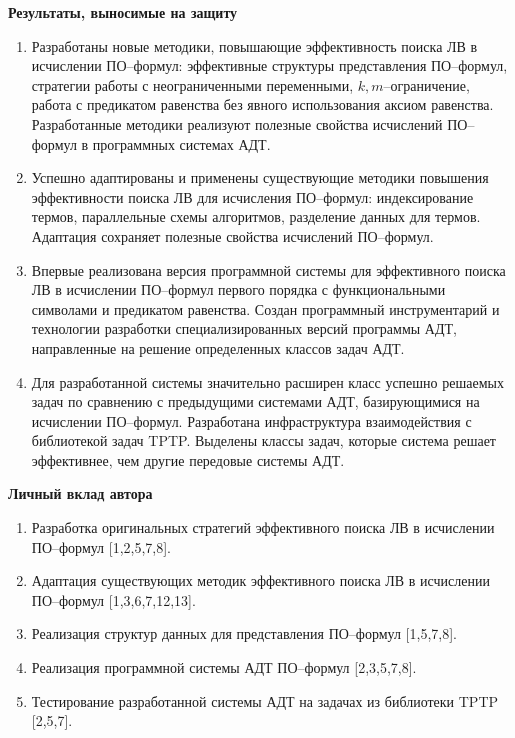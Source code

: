\documentclass[a4paper]{report}
\begin{document}
\textbf{Результаты, выносимые на защиту}
\begin{enumerate}

\item Разработаны новые методики, повышающие эффективность поиска ЛВ в исчислении ПО--формул: эффективные структуры представления ПО--формул, стратегии работы с неограниченными переменными, $k,m$--ограничение, работа с предикатом равенства без явного использования аксиом равенства. Разработанные методики реализуют полезные свойства исчислений ПО--формул в программных системах АДТ.

\item Успешно адаптированы и применены существующие методики повышения эффективности поиска ЛВ для исчисления ПО--формул: индексирование термов, параллельные схемы алгоритмов, разделение данных для термов. Адаптация сохраняет полезные свойства исчислений ПО--формул.

\item Впервые реализована версия программной системы для эффективного поиска ЛВ в исчислении ПО--формул первого порядка с функциональными символами и предикатом равенства. Создан программный инструментарий и технологии разработки специализированных версий программы АДТ, направленные на решение определенных классов задач АДТ.

\item Для разработанной системы значительно расширен класс успешно решаемых задач по сравнению с предыдущими системами АДТ, базирующимися на исчислении ПО--формул. Разработана инфраструктура взаимодействия с библиотекой задач TPTP. Выделены классы задач, которые система решает эффективнее, чем другие передовые системы АДТ.
\end{enumerate}


\textbf{Личный вклад автора}
\begin{enumerate}
\item Разработка оригинальных стратегий эффективного поиска ЛВ в исчислении ПО--формул [1,2,5,7,8].
\item Адаптация существующих методик эффективного поиска ЛВ в исчислении ПО--формул [1,3,6,7,12,13].
\item Реализация структур данных для представления ПО--формул [1,5,7,8].
\item Реализация программной системы АДТ ПО--формул [2,3,5,7,8].
\item Тестирование разработанной системы АДТ на задачах из библиотеки TPTP [2,5,7].
\end{enumerate}
\end{document}
